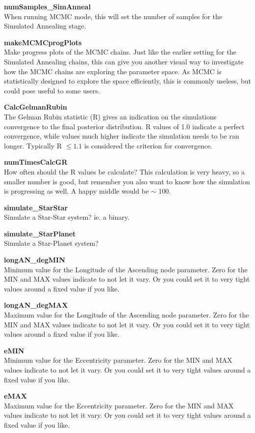 \documentclass[12pt,preprint]{aastex}
\begin{document}
{\bf numSamples\_SimAnneal}\\
When running MCMC mode, this will set the number of samples for the Simulated Annealing stage.

{\bf makeMCMCprogPlots}\\
Make progress plots of the MCMC chains.  Just like the earlier setting for the Simulated Annealing chains, this can give you another visual way to investigate how the MCMC chains are exploring the parameter space.  As MCMC is statistically designed to explore the space efficiently, this is commonly useless, but could pose useful to some users.

{\bf CalcGelmanRubin}\\
The Gelman Rubin statistic (R) gives an indication on the simulations convergence to the final posterior distribution.  R values of 1.0 indicate a perfect convergence, while values much higher indicate the simulation needs to be ran longer.  Typically R $\leq1.1$ is considered the criterion for convergence.

{\bf numTimesCalcGR}\\
How often should the R values be calculate?  This calculation is very heavy, so a smaller number is good, but remember you also want to know how the simulation is progressing as well.  A happy middle would be $\sim$ 100.

{\bf simulate\_StarStar }\\
Simulate a Star-Star system?  ie. a binary.

{\bf simulate\_StarPlanet}\\
Simulate a Star-Planet system?

{\bf longAN\_degMIN}\\
Minimum value for the Longitude of the Ascending node parameter.
Zero for the MIN and MAX values indicate to not let it vary.  Or you could set it to very tight values around a fixed value if you like.

{\bf longAN\_degMAX}\\
Maximum value for the Longitude of the Ascending node parameter.
Zero for the MIN and MAX values indicate to not let it vary.  Or you could set it to very tight values around a fixed value if you like.

{\bf eMIN}\\
Minimum value for the Eccentricity parameter.
Zero for the MIN and MAX values indicate to not let it vary.  Or you could set it to very tight values around a fixed value if you like.

{\bf eMAX}\\
Maximum value for the Eccentricity parameter.
Zero for the MIN and MAX values indicate to not let it vary.  Or you could set it to very tight values around a fixed value if you like.
\end{document}
